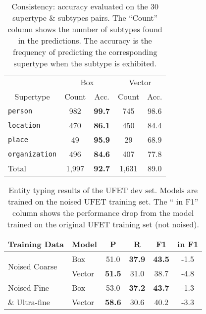 \documentclass[11pt,a4paper]{article}
\begin{document}
\renewcommand{\arraystretch}{1}
\begin{table}[t]
	\centering
\small
	\setlength{\tabcolsep}{4pt}
\begin{tabular}{l c c c c}
\toprule
		\multicolumn{1}{c}{} & \multicolumn{2}{c}{Box} & \multicolumn{2}{c}{Vector}\\
		\cmidrule(r){2-3}  \cmidrule(r){4-5}
		\multicolumn{1}{c}{Supertype} & \multicolumn{1}{c}{Count} & \multicolumn{1}{c}{Acc.} & \multicolumn{1}{c}{Count} & \multicolumn{1}{c}{Acc.}\\
		\midrule
		 {\tt person} & 982 & \textbf{99.7} & 745 & 98.6\\
		 {\tt location} & 470 & \textbf{86.1} & 450 & 84.4\\
		 {\tt place} & 49 & \textbf{95.9} & 29 & 68.9 \\
		 {\tt organization} & 496 & \textbf{84.6} & 407 & 77.8 \\
		 \midrule
		 Total & 1,997 & \textbf{92.7} & 1,631 & 89.0\\
		\bottomrule 
	\end{tabular}
\caption{Consistency: accuracy evaluated on the 30 supertype \& subtypes pairs. The ``Count'' column shows the number of subtypes found in the predictions. The accuracy is the frequency of predicting the corresponding supertype when the subtype is exhibited.}
	\label{tab:consistency}
	\vspace{-0pt}
\end{table}


\renewcommand{\arraystretch}{1}
\begin{table}[t]
	\centering
\small
	\setlength{\tabcolsep}{4pt}
\begin{tabular}{l l c  c  c  c}
\toprule
		\multicolumn{1}{c}{Training Data} & \multicolumn{1}{c}{Model}& \multicolumn{1}{c}{P} & \multicolumn{1}{c}{R} & \multicolumn{1}{c}{F1}  & \multicolumn{1}{c}{ in F1} \\
		\midrule
		 \multirow{2}{*}{Noised Coarse} & Box & 51.0 & \textbf{37.9} & \textbf{43.5} & -1.5 \\
		 & Vector & \textbf{51.5} & 31.0 & 38.7 & -4.8\\
		 \midrule
		 Noised Fine & Box & 53.0 & \textbf{37.2} & \textbf{43.7} & -1.3 \\
		 \:\:\:\:\& Ultra-fine& Vector & \textbf{58.6} & 30.6 & 40.2 & -3.3\\
		\bottomrule 
	\end{tabular}
\caption{Entity typing results of the UFET dev set. Models are trained on the noised UFET training set. The `` in F1'' column shows the performance drop from the model trained on the original UFET training set (not noised).}
	\label{tab:noised_ufet}
	\vspace{-4pt}
\end{table}
\end{document}
